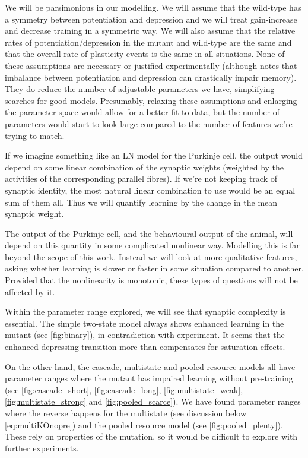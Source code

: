 \documentclass[12pt]{article}
\begin{document}
We will be parsimonious in our modelling.
We will assume that the wild-type has a symmetry between potentiation and depression and we will treat gain-increase and decrease training in a symmetric way.
We will also assume that the relative rates of potentiation/depression in the mutant and wild-type are the same and that the overall rate of plasticity events is the same in all situations.
None of these assumptions are necessary or justified experimentally (although \cite{Fusi2007multistate} notes that imbalance between potentiation and depression can drastically impair memory).
They do reduce the number of adjustable parameters we have, simplifying searches for good models.
Presumably, relaxing these assumptions and enlarging the parameter space would allow for a better fit to data, but the number of parameters would start to look large compared to the number of features we're trying to match.

If we imagine something like an LN model for the Purkinje cell, the output would depend on some linear combination of the synaptic weights (weighted by the activities of the corresponding parallel fibres).
If we're not keeping track of synaptic identity, the most natural linear combination to use would be an equal sum of them all.
Thus we will quantify learning by the change in the mean synaptic weight.

The output of the Purkinje cell, and the behavioural output of the animal, will depend on this quantity in some complicated nonlinear way.
Modelling this is far beyond the scope of this work.
Instead we will look at more qualitative features, asking whether learning is slower or faster in some situation compared to another.
Provided that the nonlinearity is monotonic, these types of questions will not be affected by it.

Within the parameter range explored, we will see that synaptic complexity is essential.
The simple two-state model always shows enhanced learning in the mutant (see \autoref{fig:binary}), in contradiction with experiment.
It seems that the enhanced depressing transition more than compensates for saturation effects.

On the other hand, the cascade, multistate and pooled resource models all have parameter ranges where the mutant has impaired learning without pre-training (see \autoref{fig:cascade_short}, \autoref{fig:cascade_long}, \autoref{fig:multistate_weak}, \autoref{fig:multistate_strong} and \autoref{fig:pooled_scarce}).
We have found parameter ranges where the reverse happens for the multistate (see discussion below \eqref{eq:multiKOnopre}) and the pooled resource model (see \autoref{fig:pooled_plenty}).
These rely on properties of the mutation, so it would be difficult to explore with further experiments.
\end{document}
